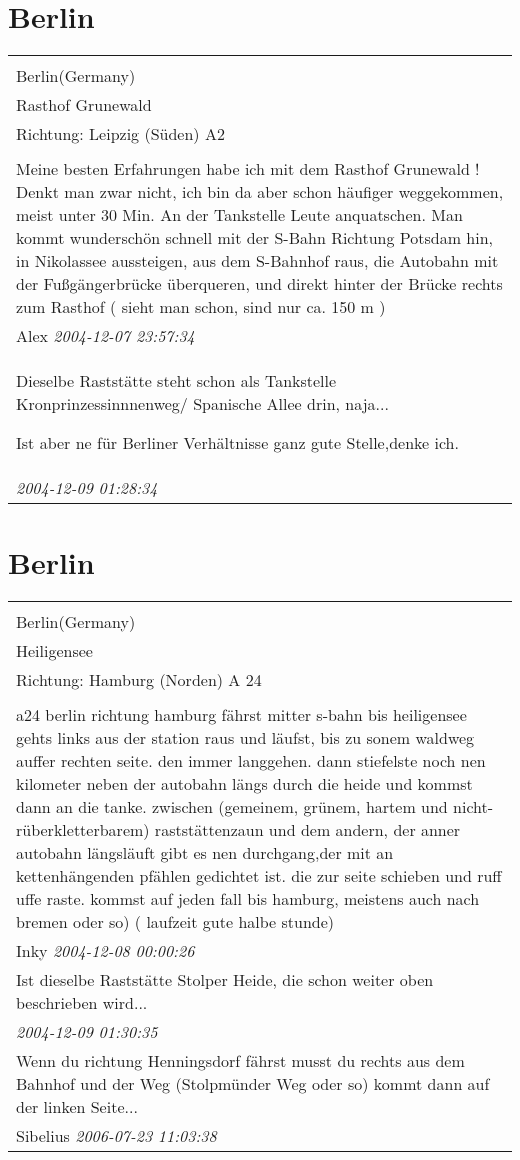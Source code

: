 \documentclass[a4paper,12pt]{article}
\begin{document}
\section{Berlin}
\begin{tabular}{|p{13cm}|}
\hline\\
Berlin(Germany)\\
Rasthof Grunewald\\
Richtung: Leipzig (Süden) A2 \\
\hline\\
Meine besten Erfahrungen habe ich mit dem Rasthof Grunewald ! Denkt man zwar nicht, ich bin da aber schon häufiger weggekommen, meist unter 30 Min. An der Tankstelle Leute anquatschen. Man kommt wunderschön schnell mit der S-Bahn Richtung Potsdam hin, in Nikolassee aussteigen, aus dem S-Bahnhof raus, die Autobahn mit der Fußgängerbrücke überqueren, und direkt hinter der Brücke rechts zum Rasthof ( sieht man schon, sind nur ca. 150 m ) \\
Alex \textit{ 2004-12-07 23:57:34 }\\\hline Dieselbe Raststätte steht schon als Tankstelle Kronprinzessinnnenweg/ Spanische Allee drin, naja...

Ist aber ne für Berliner Verhältnisse ganz gute Stelle,denke ich. \\
\textit{ 2004-12-09 01:28:34 }\\\hline
\end{tabular}


\section{Berlin}
\begin{tabular}{|p{13cm}|}
\hline\\
Berlin(Germany)\\
Heiligensee\\
Richtung: Hamburg (Norden) A 24 \\
\hline\\
a24 berlin richtung hamburg fährst mitter s-bahn bis heiligensee gehts links aus der station raus und läufst, bis zu sonem waldweg auffer rechten seite. den immer langgehen. dann stiefelste noch nen kilometer neben der autobahn längs durch die heide und kommst dann an die tanke. zwischen (gemeinem, grünem, hartem und nicht-rüberkletterbarem) raststättenzaun und dem andern, der anner autobahn längsläuft gibt es nen durchgang,der mit an kettenhängenden pfählen gedichtet ist. die zur seite schieben und ruff uffe raste. kommst auf jeden fall bis hamburg, meistens auch nach bremen oder so) ( laufzeit gute halbe stunde) \\
Inky \textit{ 2004-12-08 00:00:26 }\\\hline Ist dieselbe Raststätte Stolper Heide, die schon weiter oben beschrieben wird... \\
\textit{ 2004-12-09 01:30:35 }\\\hline Wenn du richtung Henningsdorf fährst musst du rechts aus dem Bahnhof und der Weg (Stolpmünder Weg oder so) kommt dann auf der linken Seite... \\
Sibelius \textit{ 2006-07-23 11:03:38 }\\\hline
\end{tabular}
\end{document}
